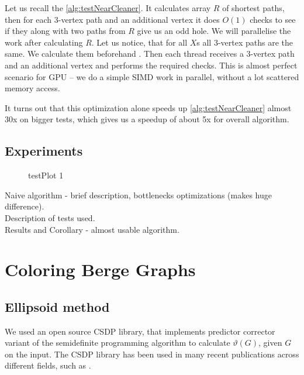 Let us recall the \cref{alg:testNearCleaner}. It calculates array $R$ of shortest paths, then for each 3-vertex path and an additional vertex it does $O(1)$ checks to see if they along with two paths from $R$ give us an odd hole. We will parallelise the work after calculating $R$. Let us notice, that for all $X$s all 3-vertex paths are the same. We calculate them beforehand  . Then each thread receives a 3-vertex path and an additional vertex and performs the required checks. This is almost perfect scenario for GPU -- we do a simple SIMD work in parallel, without a lot scattered memory access.

It turns out that this optimization alone speeds up \cref{alg:testNearCleaner} almost 30x  on bigger tests, which gives us a speedup of about 5x  for overall algorithm.


\subsection{Experiments}
\label{sec:experiments}

\begin{figure}
  \centering
  
  \caption{testPlot 1}
\end{figure}

Naive algorithm - brief description, bottlenecks optimizations (makes huge difference).\\

Description of tests used.\\

Results and Corollary - almost usable algorithm.


\section{Coloring Berge Graphs}

\subsection{Ellipsoid method}

We used an open source CSDP \cite{csdpRepo, csdp1999} library, that implements predictor corrector variant of the semidefinite programming algorithm to calculate $\vartheta(G)$, given $G$ on the input. The CSDP library has been used in many recent publications across different fields, such as \cite{Ampountolas_2017, Adasme_2011}.

